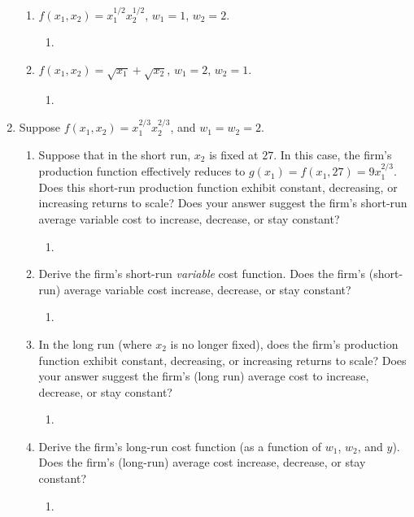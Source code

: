 \documentclass[11pt]{article}
\begin{document}
\begin{enumerate}
\begin{enumerate}
        \item $f(x_{1},x_{2})=x_{1}^{1/2}x_{2}^{1/2}$, $w_{1}=1$, $w_{2}=2$.
        \begin{enumerate}
            \item 
        \end{enumerate}

        \item $f(x_{1},x_{2})=\sqrt{x_{1}}+\sqrt{x_{2}}$, $w_{1}=2$, $w_{2}=1$.
        \begin{enumerate}
            \item 
        \end{enumerate}
    \end{enumerate}

\item Suppose $f(x_{1},x_{2})=x_{1}^{2/3}x_{2}^{2/3}$, and $w_{1}=w_{2}=2$.
    \begin{enumerate}
        \item Suppose that in the short run, $x_{2}$ is fixed at $27$. In this case, the firm's production function effectively reduces to $g(x_{1})=f(x_{1},27)=9x_{1}^{2/3}$. Does this short-run production function exhibit constant, decreasing, or increasing returns to scale? Does your answer suggest the firm's short-run average variable cost to increase, decrease, or stay constant?
        \begin{enumerate}
            \item 
        \end{enumerate}

        \item Derive the firm's short-run \emph{variable} cost function. Does the firm's (short-run) average variable cost increase, decrease, or stay constant?
        \begin{enumerate}
            \item 
        \end{enumerate}

        \item In the long run (where $x_{2}$ is no longer fixed), does the firm's production function exhibit constant, decreasing, or increasing returns to scale? Does your answer suggest the firm's (long run) average cost to increase, decrease, or stay constant?
        \begin{enumerate}
            \item 
        \end{enumerate}

        \item Derive the firm's long-run cost function (as a function of $w_{1}$, $w_{2}$, and $y$). Does the firm's (long-run) average cost increase, decrease, or stay constant?
        \begin{enumerate}
            \item 
        \end{enumerate}
    \end{enumerate}

\end{enumerate}
\end{document}
